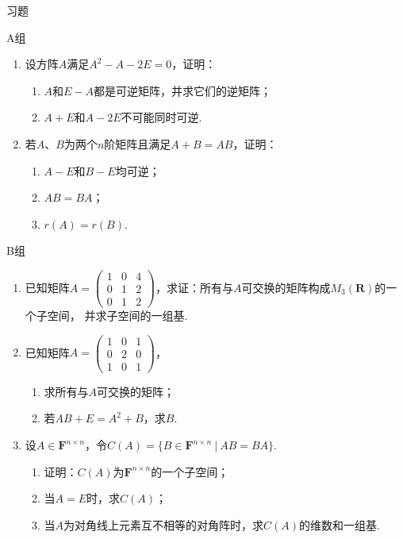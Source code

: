 \centerline{\heiti \Large 习题}
\vspace{2ex}
{\kaishu }
\begin{flushright}
    \kaishu

\end{flushright}
\centerline{\heiti A组}
\begin{enumerate}
    \item 设方阵$A$满足$A^2-A-2E=0$，证明：
	\begin{enumerate}[label=(\arabic*)]
        \item $A$和$E-A$都是可逆矩阵，并求它们的逆矩阵；
        \item $A+E$和$A-2E$不可能同时可逆.
    \end{enumerate}
    \item 若$A$、$B$为两个$n$阶矩阵且满足$A+B=AB$，证明：
    \begin{enumerate}
        \item $A-E$和$B-E$均可逆；
        \item $AB=BA$；
        \item $r(A)=r(B)$.
    \end{enumerate}
\end{enumerate}
\centerline{\heiti B组}
\begin{enumerate}
    \item 已知矩阵$A=\begin{pmatrix}
		1 & 0 & 4 \\ 0 & 1 & 2 \\ 0 & 1 & 2
	\end{pmatrix}$，求证：所有与$A$可交换的矩阵构成$M_3(\mathbf{R})$的一个子空间，
    并求子空间的一组基.
    \item 已知矩阵$A=\begin{pmatrix}
		1 & 0 & 1 \\ 0 & 2 & 0 \\ 1 & 0 & 1
	\end{pmatrix}$，
	\begin{enumerate}
        \item 求所有与$A$可交换的矩阵；
        \item 若$AB+E=A^2+B$，求$B$.
    \end{enumerate}
    \item 设$A \in \mathbf{F}^{n \times n}$，令$C(A)=\{B \in \mathbf{F}^{n \times n}\ |\ AB=BA\}$.
	\begin{enumerate}[label=(\arabic*)]
        \item 证明：$C(A)$为$\mathbf{F}^{n \times n}$的一个子空间；
        \item 当$A=E$时，求$C(A)$；
        \item 当$A$为对角线上元素互不相等的对角阵时，求$C(A)$的维数和一组基.
    \end{enumerate}
\end{enumerate}
